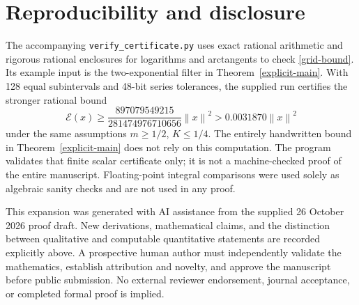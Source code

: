 \documentclass[11pt,a4paper]{article}
\theoremstyle{definition}\newtheorem{definition}[theorem]{Definition}
\theoremstyle{remark}\newtheorem{remark}[theorem]{Remark}
\newcommand{\E}{\mathcal E}\newcommand{\D}{\mathcal D}
\newcommand{\norm}[1]{\left\lVert #1\right\rVert}
\begin{document}
\section{Reproducibility and disclosure}
The accompanying \texttt{verify\_certificate.py} uses exact rational arithmetic and rigorous rational enclosures for logarithms and arctangents to check \eqref{grid-bound}. Its example input is the two-exponential filter in Theorem~\ref{explicit-main}. With 128 equal subintervals and 48-bit series tolerances, the supplied run certifies the stronger rational bound
\[
 \E(x)\ge\frac{897079549215}{281474976710656}\norm{x}^2
 >0.0031870\norm{x}^2
\]
under the same assumptions $m\ge1/2$, $K\le1/4$. The entirely handwritten bound in Theorem~\ref{explicit-main} does not rely on this computation. The program validates that finite scalar certificate only; it is not a machine-checked proof of the entire manuscript. Floating-point integral comparisons were used solely as algebraic sanity checks and are not used in any proof.

This expansion was generated with AI assistance from the supplied 26 October 2026 proof draft. New derivations, mathematical claims, and the distinction between qualitative and computable quantitative statements are recorded explicitly above. A prospective human author must independently validate the mathematics, establish attribution and novelty, and approve the manuscript before public submission. No external reviewer endorsement, journal acceptance, or completed formal proof is implied.
\end{document}
